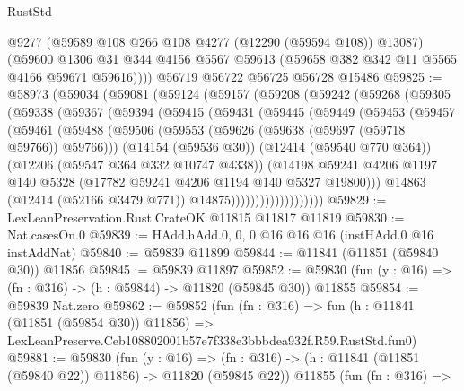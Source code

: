 \begin{lexlean}{RustStd}
\begin{coremodule}
        @9277
        (@59589 @108 @266 @108 @4277 (@12290 (@59594 @108)) @13087)
        (@59600
          @1306
          @31
          @344
          @4156
          @5567
          @59613
          (@59658 @382 @342 @11 @5565 @4166 @59671 @59616))))
    @56719
    @56722
    @56725
    @56728
    @15486
@59825 := @58973
    (@59034
      (@59081
        (@59124
          (@59157
            (@59208
              (@59242
                (@59268
                  (@59305
                    (@59338
                      (@59367
                        (@59394
                          (@59415
                            (@59431
                              (@59445
                                (@59449
                                  (@59453
                                    (@59457
                                      (@59461
                                        (@59488
                                          (@59506
                                            (@59553
                                              (@59626 (@59638 (@59697 (@59718 @59766)) @59766)))
                                            (@14154 (@59536 @30))
                                            (@12414 (@59540 @770 @364))
                                            (@12206 (@59547 @364 @332 @10747 @4338))
                                            (@14198
                                              @59241
                                              @4206
                                              @1197
                                              @140
                                              @5328
                                              (@17782 @59241 @4206 @1194 @140 @5327 @19800)))
                                          @14863
                                          (@12414 (@52166 @3479 @771))
                                          @14875)))))))))))))))))))
@59829 := LexLeanPreservation.Rust.CrateOK @11815 @11817 @11819
@59830 := Nat.casesOn.{0}
@59839 := HAdd.hAdd.{0, 0, 0} @16 @16 @16 (instHAdd.{0} @16 instAddNat)
@59840 := @59839 @11899
@59844 := @11841 (@11851 (@59840 @30)) @11856
@59845 := @59839 @11897
@59852 := @59830 (fun (y : @16) => (fn : @316) -> (h : @59844) -> @11820 (@59845 @30)) @11855
@59854 := @59839 Nat.zero
@59862 := @59852
    (fun (fn : @316) =>
    fun (h : @11841 (@11851 (@59854 @30)) @11856) =>
    LexLeanPreserve.Ceb108802001b57e7f338e3bbbdea932f.R59.RustStd.fun0)
@59881 := @59830
    (fun (y : @16) =>
    (fn : @316) -> (h : @11841 (@11851 (@59840 @22)) @11856) -> @11820 (@59845 @22))
    @11855
    (fun (fn : @316) =>

\end{coremodule}
\end{lexlean}
